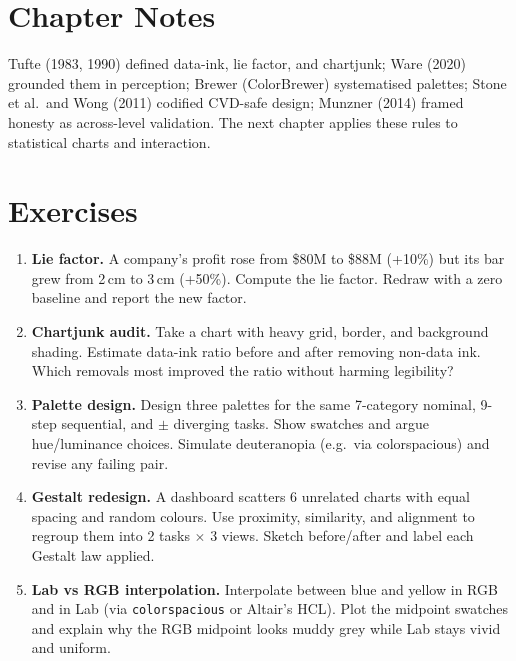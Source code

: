 \section{Chapter Notes}
Tufte (1983, 1990) defined data-ink, lie factor, and chartjunk; Ware (2020) grounded them in perception; Brewer (ColorBrewer) systematised palettes; Stone et al.\ and Wong (2011) codified CVD-safe design; Munzner (2014) framed honesty as across-level validation. The next chapter applies these rules to statistical charts and interaction.

\section{Exercises}
\label{sec:ch03-exercises}
\begin{enumerate}[label=E3.\arabic*, leftmargin=*, itemsep=0.8em]
    \item \textbf{Lie factor.} A company's profit rose from \$80M to \$88M (+10\%) but its bar grew from 2\,cm to 3\,cm (+50\%). Compute the lie factor. Redraw with a zero baseline and report the new factor.
    \item \textbf{Chartjunk audit.} Take a chart with heavy grid, border, and background shading. Estimate data-ink ratio before and after removing non-data ink. Which removals most improved the ratio without harming legibility?
    \item \textbf{Palette design.} Design three palettes for the same 7-category nominal, 9-step sequential, and $\pm$ diverging tasks. Show swatches and argue hue/luminance choices. Simulate deuteranopia (e.g.\ via colorspacious) and revise any failing pair.
    \item \textbf{Gestalt redesign.} A dashboard scatters 6 unrelated charts with equal spacing and random colours. Use proximity, similarity, and alignment to regroup them into 2 tasks $\times$ 3 views. Sketch before/after and label each Gestalt law applied.
    \item \textbf{Lab vs RGB interpolation.} Interpolate between blue and yellow in RGB and in Lab (via \texttt{colorspacious} or Altair's HCL). Plot the midpoint swatches and explain why the RGB midpoint looks muddy grey while Lab stays vivid and uniform.
\end{enumerate}
